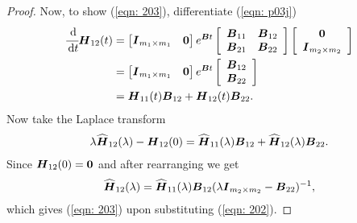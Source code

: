 \begin{proof}
	Now, to show (\ref{eqn: 203}), differentiate (\ref{eqn: p03j})
	\begin{align}
		\cfrac{\, \mathrm{d}}{\, \mathrm{d} t}\boldsymbol H_{12}(t) &= \begin{bmatrix}   \boldsymbol I_{m_1\times m_1} & \boldsymbol 0 \end{bmatrix}e^{\boldsymbol Bt} \left[\begin{array}{cc} \boldsymbol B_{11} & \boldsymbol B_{12} \\ \boldsymbol B_{21} & \boldsymbol B_{22} \end{array}\right] \left[\begin{array}{c} \boldsymbol 0 \\ \boldsymbol I_{m_2\times m_2}\end{array}\right]
		\\&= \begin{bmatrix}   \boldsymbol I_{m_1\times m_1} & \boldsymbol 0 \end{bmatrix}e^{\boldsymbol Bt} \left[\begin{array}{c} \boldsymbol B_{12} \\ \boldsymbol B_{22} \end{array}\right] 
		\\&= \boldsymbol H_{11}(t) \boldsymbol B_{12} + \boldsymbol H_{12}(t)\boldsymbol B_{22}.
	\end{align}
	Now take the Laplace transform 
	\begin{align}
		\lambda \widehat{\boldsymbol H}_{12}(\lambda) - \boldsymbol H_{12}(0) = \widehat{\boldsymbol H}_{11}(\lambda) \boldsymbol B_{12} + \widehat{\boldsymbol H}_{12}(\lambda)\boldsymbol B_{22}.
	\end{align}
	Since \(\boldsymbol H_{12}(0)=\boldsymbol 0\) and after rearranging we get 
	\begin{align}
		\widehat{\boldsymbol H}_{12}(\lambda) = \widehat{\boldsymbol H}_{11}(\lambda) \boldsymbol B_{12} (\lambda \boldsymbol I_{m_2\times m_2} -\boldsymbol B_{22})^{-1},
	\end{align}
	which gives (\ref{eqn: 203}) upon substituting (\ref{eqn: 202}).
\end{proof}


